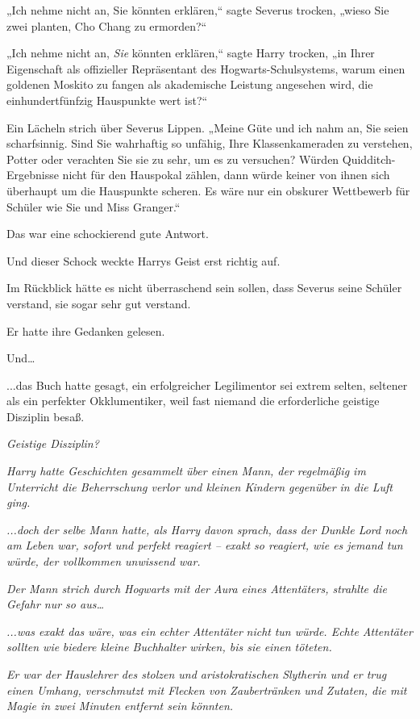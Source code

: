 {„Ich nehme nicht an, Sie könnten erklären,“ sagte Severus trocken, „wieso Sie zwei planten, Cho Chang zu ermorden?“

„Ich nehme nicht an, \emph{Sie} könnten erklären,“ sagte Harry trocken, „in Ihrer Eigenschaft als offizieller Repräsentant des Hogwarts-Schulsystems, warum einen goldenen Moskito zu fangen als akademische Leistung angesehen wird, die einhundertfünfzig Hauspunkte wert ist?“

Ein Lächeln strich über Severus Lippen. „Meine Güte und ich nahm an, Sie seien scharfsinnig. Sind Sie wahrhaftig so unfähig, Ihre Klassenkameraden zu verstehen, Potter oder verachten Sie sie zu sehr, um es zu versuchen? Würden Quidditch-Ergebnisse nicht für den Hauspokal zählen, dann würde keiner von ihnen sich überhaupt um die Hauspunkte scheren. Es wäre nur ein obskurer Wettbewerb für Schüler wie Sie und Miss Granger.“

Das war eine schockierend gute Antwort.

Und dieser Schock weckte Harrys Geist erst richtig auf.

Im Rückblick hätte es nicht überraschend sein sollen, dass Severus seine Schüler verstand, sie sogar sehr gut verstand.

Er hatte ihre Gedanken gelesen.

Und…

...das Buch hatte gesagt, ein erfolgreicher Legilimentor sei extrem selten, seltener als ein perfekter Okklumentiker, weil fast niemand die erforderliche geistige Disziplin besaß.

\emph{Geistige Disziplin?}

\emph{Harry hatte Geschichten gesammelt über einen Mann, der regelmäßig im Unterricht die Beherrschung verlor und kleinen Kindern gegenüber in die Luft ging.}

\emph{...doch der selbe Mann hatte, als Harry davon sprach, dass der Dunkle Lord noch am Leben war, sofort und perfekt reagiert -- exakt so reagiert, wie es jemand tun würde, der vollkommen unwissend war.}

\emph{Der Mann strich durch Hogwarts mit der Aura eines Attentäters, strahlte die Gefahr nur so aus…}

\emph{...was exakt das wäre, was ein echter Attentäter} \emph{\emph{nicht}} \emph{tun würde. Echte Attentäter sollten wie} \emph{biedere kleine Buchhalter} \emph{wirken, bis sie einen töteten.}

\emph{Er war der Hauslehrer des stolzen und aristokratischen Slytherin und er trug einen Umhang, verschmutzt mit Flecken von Zaubertränken und Zutaten, die mit Magie in zwei Minuten entfernt sein könnten.}

}
